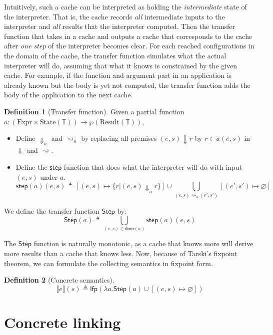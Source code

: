 \documentclass[acmsmall,review]{acmart}\settopmatter{printfolios=true,printccs=false,printacmref=false}
\theoremstyle{definition}
\newtheorem{definition}{Definition}[section]
\newcommand*{\Expr}{\text{Expr}}
\newcommand*{\Time}{\mathbb{T}}
\newcommand*{\State}[1]{\text{State}({#1})}
\newcommand*{\Result}[1]{\text{Result}({#1})}
\newcommand*{\sembracket}[1]{\lBrack{#1}\rBrack}
\begin{document}
Intuitively, such a cache can be interpreted as holding the \emph{intermediate} state of the interpreter.
That is, the cache records \emph{all} intermediate inputs to the interpreter and \emph{all} results that the interpreter computed.
Then the transfer function that takes in a cache and outputs a cache that corresponds to the cache after \emph{one step} of the interpreter becomes clear.
For each reached configurations in the domain of the cache, the transfer function simulates what the actual interpreter will do, assuming that what it knows is constrained by the given cache.
For example, if the function and argument part in an application is already known but the body is yet not computed, the transfer function adds the body of the application to the next cache.


\begin{definition}[Transfer function]
  Given a partial function $a : (\Expr\times\State{\Time})\rightarrow{\wp(\Result{\Time})}$,

  \begin{itemize}
    \item Define ${\Downarrow}_{a}$ and ${\rightsquigarrow}_{a}$ by replacing all premises $(e,s)\Downarrow r$ by $r\in a(e,s)$ in $\Downarrow$ and $\rightsquigarrow$.
    \item Define the ${\mathsf{step}}$ function that does what the interpreter will do with input $(e,s)$ under $a$.
          \[
            \mathsf{step}(a)(e,s)\triangleq
            [(e,s)\mapsto\{r|(e,s){\Downarrow}_{a}r\}]
            \cup
            \bigcup_{(e,s)\rightsquigarrow_{a}(e',s')}[(e',s')\mapsto\varnothing]
          \]
  \end{itemize}

  We define the transfer function $\mathsf{Step}$ by:
  \[
    \mathsf{Step}(a)\triangleq
    \bigcup_{(e,s)\in\mathsf{dom}(a)}
    {\mathsf{step}(a)(e,s)}
  \]
\end{definition}

The $\mathsf{Step}$ function is naturally monotonic, as a cache that knows more will derive more results than a cache that knows less.
Now, because of Tarski's fixpoint theorem, we can formulate the collecting semantics in fixpoint form.
\begin{definition}[Concrete semantics]
  \[
    \sembracket{e}(s)\triangleq\mathsf{lfp}(\lambda a.\mathsf{Step}(a)\cup[(e,s)\mapsto\varnothing])
  \]
\end{definition}

\section{Concrete linking}
\end{document}
